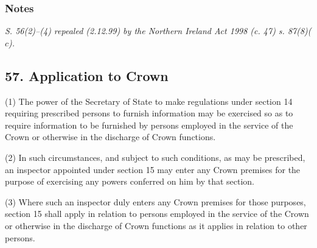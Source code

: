 \documentclass[a4paper]{article}
\newcommand\amendment[1]{\subsubsection*{Notes}{\itshape\frenchspacing\footnotesize #1 \par}}
\begin{document}
%
%
%
%

\amendment{
S. 56(2)--(4) repealed (2.12.99) by the Northern Ireland Act 1998 (c. 47) s. 87(8)($c$).
}

\subsection{57. Application to Crown}

(1) The power of the Secretary of State to make regulations under section 14 requiring prescribed persons to furnish information may be exercised so as to require information to be furnished by persons employed in the service of the Crown or otherwise in the discharge of Crown functions.

(2)
In such circumstances, and subject to such conditions, as may be prescribed, an inspector appointed under section 15 may enter any Crown premises for the purpose of exercising any powers conferred on him by that section.

(3)
Where such an inspector duly enters any Crown premises for those purposes, section 15 shall apply in relation to persons employed in the service of the Crown or otherwise in the discharge of Crown functions as it applies in relation to other persons.
\end{document}
